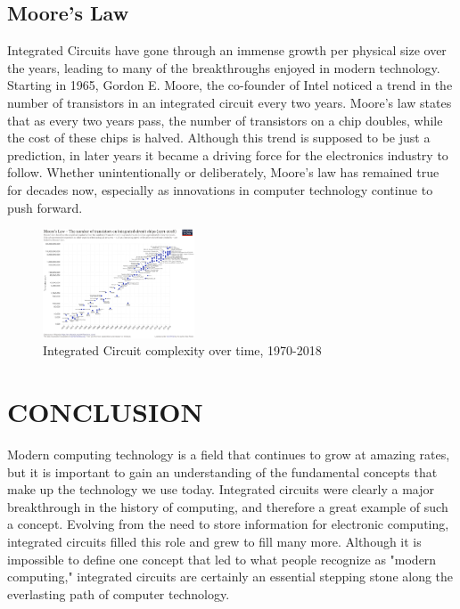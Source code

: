 \documentclass[letterpaper, 10 pt, conference]{IEEEconf}
\begin{document}
\subsection{Moore's Law}
Integrated Circuits have gone through an immense growth per physical size over the years, leading to many of the breakthroughs enjoyed in modern technology. Starting in 1965, Gordon E. Moore, the co-founder of Intel noticed a trend in the number of transistors in an integrated circuit every two years. Moore’s law states that as every two years pass, the number of transistors on a chip doubles, while the cost of these chips is halved. Although this trend is supposed to be just a prediction, in later years it became a driving force for the electronics industry to follow. Whether unintentionally or deliberately, Moore's law has remained true for decades now, especially as innovations in computer technology continue to push forward.


\begin{figure}[h!]
\centering
\captionsetup{justification=centering}
\includegraphics[width=0.4\textwidth]{Moore's_Law_Transistor_Count_1971-2018.png}
\caption{Integrated Circuit complexity over time, 1970-2018}
\label{fig:example}
\end{figure}


\section{CONCLUSION}

Modern computing technology is a field that continues to grow at amazing rates, but it is important to gain an understanding of the fundamental concepts that make up the technology we use today. Integrated circuits were clearly a major breakthrough in the history of computing, and therefore a great example of such a concept. Evolving from the need to store information for electronic computing, integrated circuits filled this role and grew to fill many more. Although it is impossible to define one concept that led to what people recognize as "modern computing," integrated circuits are certainly an essential stepping stone along the everlasting path of computer technology.
\end{document}

